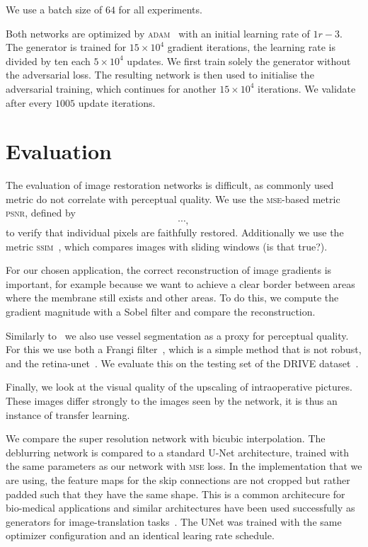 \documentclass{scrartcl}
\begin{document}
We use a batch size of $64$ for all experiments.

Both networks are optimized by \textsc{adam}~\cite{Adam} with an initial learning rate of $1r-3$.
The generator is trained for $15 \times 10^4$ gradient iterations, the learning rate is divided by ten each $5 \times 10^4$ updates.
We first train solely the generator without the adversarial loss.
The resulting network is then used to initialise the adversarial training, which continues for another $15 \times 10^4$ iterations.
We validate after every $1005$ update iterations.

\section{Evaluation}
The evaluation of image restoration networks is difficult, as commonly used metric do not correlate with perceptual quality.
We use the \textsc{mse}-based metric \textsc{psnr}, defined by
\begin{equation}
  \label{eq:psnr}
  \cdots,
\end{equation}
to verify that individual pixels are faithfully restored.
Additionally we use the metric \textsc{ssim}~\cite{Ssim}, which compares images with sliding windows (is that true?).

For our chosen application, the correct reconstruction of image gradients is important, for example because we want to achieve a clear border between areas where the membrane still exists and other areas.
To do this, we compute the gradient magnitude with a Sobel filter and compare the reconstruction.

Similarly to~\cite{SaliencyGAN} we also use vessel segmentation as a proxy for perceptual quality.
For this we use both a Frangi filter~\cite{Frangi}, which is a simple method that is not robust, and the retina-unet~\cite{RetinaUnet}.
We evaluate this on the testing set of the DRIVE dataset~\cite{Drive}.

Finally, we look at the visual quality of the upscaling of intraoperative pictures.
These images differ strongly to the images seen by the network, it is thus an instance of transfer learning.

We compare the super resolution network with bicubic interpolation.
The deblurring network is compared to a standard U-Net architecture, trained with the same parameters as our network with \textsc{mse} loss.
In the implementation that we are using, the feature maps for the skip connections are not cropped but rather padded such that they have the same shape.
This is a common architecure for bio-medical applications and similar architectures have been used successfully as generators for image-translation tasks~\cite{PatchGAN}.
The UNet was trained with the same optimizer configuration and an identical learing rate schedule.
\end{document}
